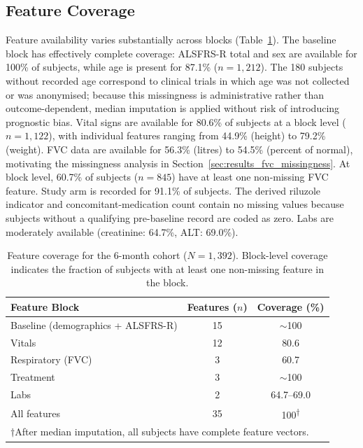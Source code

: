 \subsection{Feature Coverage}
\label{subsec:results_coverage}
Feature availability varies substantially across blocks (Table~\ref{tab:feature_coverage}).
The baseline block has effectively complete coverage: ALSFRS-R total and sex are available for 100\% of subjects, while age is present for 87.1\% ($n\!=\!1{,}212$).
The 180 subjects without recorded age correspond to clinical trials in which age was not collected or was anonymised; because this missingness is administrative rather than outcome-dependent, median imputation is applied without risk of introducing prognostic bias.
Vital signs are available for 80.6\% of subjects at a block level ($n\!=\!1{,}122$), with individual features ranging from 44.9\% (height) to 79.2\% (weight).
FVC data are available for 56.3\% (litres) to 54.5\% (percent of normal), motivating the missingness analysis in Section~\ref{sec:results_fvc_missingness}.
At block level, 60.7\% of subjects ($n\!=\!845$) have at least one non-missing FVC feature.
Study arm is recorded for 91.1\% of subjects. The derived riluzole indicator and concomitant-medication count contain no missing values because subjects without a qualifying pre-baseline record are coded as zero.
Labs are moderately available (creatinine: 64.7\%, ALT: 69.0\%).

\begin{table}[ht]
\centering
\caption[Feature coverage, 6-month cohort]{Feature coverage for the 6-month cohort ($N\!=\!1{,}392$). Block-level coverage indicates the fraction of subjects with at least one non-missing feature in the block.}
\label{tab:feature_coverage}
\small
\begin{tabular}{lcc}
\toprule
Feature Block & Features ($n$) & Coverage (\%) \\
\midrule
Baseline (demographics + ALSFRS-R) & 15 & $\sim$100 \\
Vitals & 12 & 80.6 \\
Respiratory (FVC) & 3 & 60.7 \\
Treatment & 3 & $\sim$100 \\
Labs & 2 & 64.7--69.0 \\
\midrule
All features & 35 & 100\textsuperscript{$\dagger$} \\
\bottomrule
\multicolumn{3}{l}{\footnotesize $\dagger$After median imputation, all subjects have complete feature vectors.}
\end{tabular}
\end{table}

